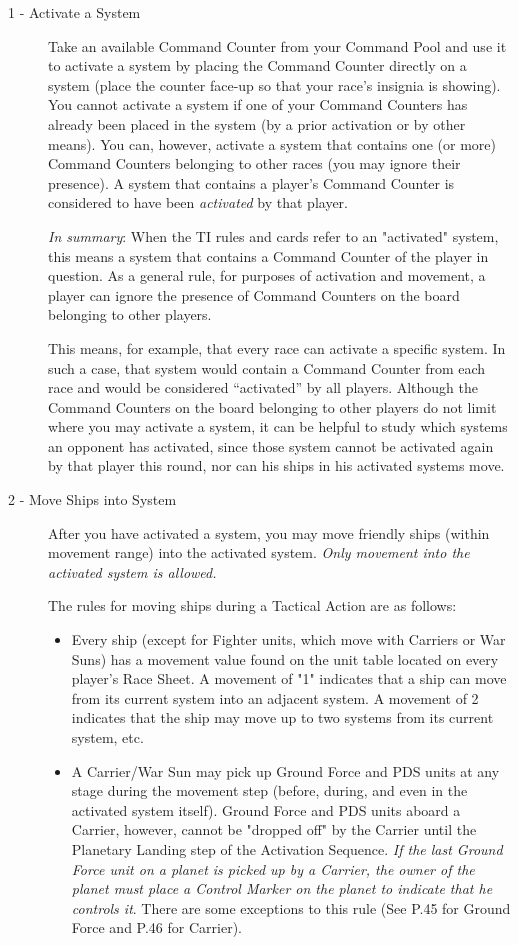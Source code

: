 \documentclass[11pt,fleqn]{book} %
\begin{document}
\begin{description}
\item [1 - Activate a System] Take an available Command Counter from your Command Pool and use it to activate a system by placing the Command Counter directly on a system (place the counter face-up so that your race's insignia is showing). You cannot activate a system if one of your Command Counters has already been placed in the system (by a prior activation or by other means). You can, however, activate a system that contains one (or more) Command Counters belonging to other races (you may ignore their presence). A system that contains a player's Command Counter is considered to have been \emph{activated} by that player.  

\emph{In summary}: When the TI rules and cards refer to an "activated" system, this means a system that contains a Command Counter of the player in question. 
As a general rule, for purposes of activation and movement, a player can ignore the presence of Command Counters on the board belonging to other players.

This means, for example, that every race can activate a specific system. In such a case, that system would contain a Command Counter from each race and would be considered “activated” by all players.  Although the Command Counters on the board belonging to other players do not limit where you may activate a system, it can be helpful to study which systems an opponent has activated, since those system cannot be activated again by that player this round, nor can his ships in his activated systems move. 

\item [2 -  Move Ships into System] 
After you have activated a system, you may move friendly ships (within movement range) into the activated system. \emph{Only movement into the activated system is allowed.}

The rules for moving ships during a Tactical Action are as follows:
\begin{itemize}
    \item Every ship (except for Fighter units, which move with Carriers or War Suns) has a movement value found on the unit table located on every player's Race Sheet. A movement of "1" indicates that a ship can move from its current system into an adjacent system. A movement of 2 indicates that the ship may move up to two systems from its current system, etc.
    \item A Carrier/War Sun may pick up Ground Force and PDS units at any stage during the movement step (before, during, and even in the activated system itself). Ground Force and PDS units aboard a Carrier, however, cannot be "dropped off" by the Carrier until the Planetary Landing step of the Activation Sequence. \emph{If the last Ground Force unit on a planet is picked up by a Carrier, the owner of the planet must place a Control Marker on the planet to indicate that he controls it}. There are some exceptions to this rule (See P.45 for Ground Force and P.46 for Carrier).
    

\end{itemize}
\end{description}
\end{document}
